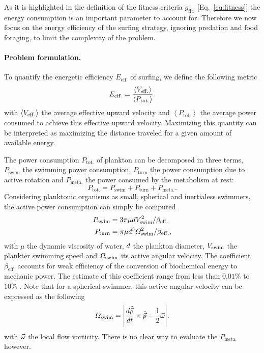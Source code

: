 As it is highlighted in the definition of the fitness criteria $g_{\mathrm{fit.}}$ [Eq.~\eqref{eq:fitness}] the energy consumption is an important parameter to account for.
Therefore we now focus on the energy efficiency of the surfing strategy, ignoring predation and food foraging, to limit the complexity of the problem.

\paragraph{Problem formulation.} 

To quantify the energetic efficiency $E_{\mathrm{eff.}}$ of surfing, we define the following metric
\begin{equation}\label{eq:definition_efficiency}
	E_{\mathrm{eff.}} = \frac{\left\langle V_{\mathrm{eff.}} \right\rangle}{\left\langle P_{\mathrm{tot.}} \right\rangle}.
\end{equation}
with $\left\langle V_{\mathrm{eff.}} \right\rangle$ the average effective upward velocity and $\left\langle P_{\mathrm{tot.}} \right\rangle$ the average power consumed to achieve this effective upward velocity.
Maximizing this quantity can be interpreted as maximizing the distance traveled for a given amount of available energy.

The power consumption $P_{\mathrm{tot.}}$ of plankton can be decomposed in three terms, $P_{\mathrm{swim}}$ the swimming power consumption, $P_{\mathrm{turn}}$ the power consumption due to active rotation and $P_{\mathrm{meta.}}$ the power consumed by the metabolism at rest:
\begin{equation}
	P_{\mathrm{tot.}} = P_{\mathrm{swim}} + P_{\mathrm{turn}} + P_{\mathrm{meta.}}.
\end{equation}
Considering planktonic organisms as small, spherical and inertialess swimmers, the active power consumption can simply be computed
\begin{subequations}
	\begin{align}
		P_{\mathrm{swim}} &= 3 \pi \mu d V_{\mathrm{swim}}^2 / \beta_{\mathrm{eff.}}\label{eq:p_swim}\\
		P_{\mathrm{turn}} &= \pi \mu d^3 \varOmega_{\mathrm{swim}}^2 / \beta_{\mathrm{eff.}},\label{eq:p_turn}
	\end{align}
\end{subequations}
with $\mu$ the dynamic viscosity of water, $d$ the plankton diameter, $V_{\mathrm{swim}}$ the plankter swimming speed and $\varOmega_{\mathrm{swim}}$ its active angular velocity.
The coefficient $\beta_{\mathrm{eff.}}$ accounts for weak efficiency of the conversion of biochemical energy to mechanic power.
The estimate of this coefficient range from less than $0.01\%$ to $10\%$ \citep{minkina1981estimation, morris1985propulsion, buskey1998energetic}.
Note that for a spherical swimmer, this active angular velocity can be expressed as the following
\begin{equation}
	\SwimmingAngularVelocity = \norm*{\frac{d \SwimmingDirection}{dt} \times \SwimmingDirection - \frac{1}{2} \FlowVorticity}.
\end{equation}
with $\vec{\omega}$ the local flow vorticity.
There is no clear way to evaluate the $P_{\mathrm{meta.}}$ however. 

